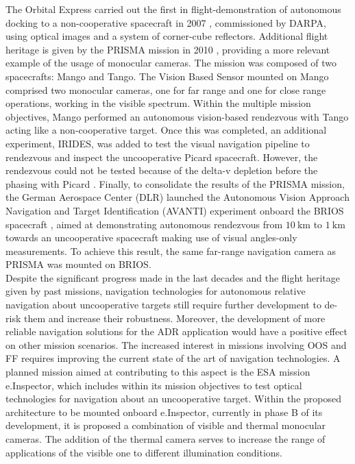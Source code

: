 The Orbital Express carried out the first in flight-demonstration of autonomous docking to a non-cooperative spacecraft in 2007 \cite{pinson2008orbital}, commissioned by DARPA, using optical images and a system of corner-cube reflectors. Additional flight heritage is given by the PRISMA mission in 2010 \cite{karlsson2014prisma}, providing a more relevant example of the usage of monocular cameras. The mission was composed of two spacecrafts: Mango and Tango. The Vision Based Sensor mounted on Mango comprised two monocular cameras, one for far range and one for close range operations, working in the visible spectrum. Within the multiple mission objectives, Mango performed an autonomous vision-based rendezvous with Tango acting like a non-cooperative target. Once this was completed, an additional experiment, IRIDES, was added to test the visual navigation pipeline to rendezvous and inspect the uncooperative Picard spacecraft. However, the rendezvous could not be tested because of the delta-v depletion before the phasing with Picard \cite{doi:10.2514/1.G003239}. Finally, to consolidate the results of the PRISMA mission, the German Aerospace Center (DLR) launched the Autonomous Vision Approach Navigation and Target Identification (AVANTI) experiment onboard the BRIOS spacecraft \cite{gaias2018flight}, aimed at demonstrating autonomous rendezvous from $\SI{10}{\kilo\meter}$ to $\SI{1}{\kilo\meter}$ towards an uncooperative spacecraft making use of visual angles-only measurements. To achieve this result, the same far-range navigation camera as PRISMA was mounted on BRIOS.\\
Despite the significant progress made in the last decades and the flight heritage given by past missions, navigation technologies for autonomous relative navigation about uncooperative targets still require further development to de-risk them and increase their robustness. Moreover, the development of more reliable navigation solutions for the ADR application would have a positive effect on other mission scenarios. The increased interest in missions involving OOS and FF requires improving the current state of the art of navigation technologies. A planned mission aimed at contributing to this aspect is the ESA mission e.Inspector, which includes within its mission objectives to test optical technologies for navigation about an uncooperative target. Within the proposed architecture to be mounted onboard e.Inspector, currently in phase B of its development, it is proposed a combination of visible and thermal monocular cameras. The addition of the thermal camera serves to increase the range of applications of the visible one to different illumination conditions. 


